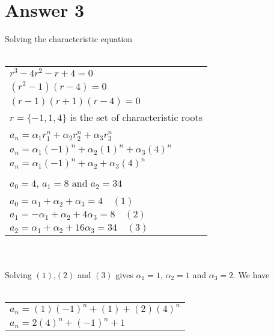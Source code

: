 \documentclass[12pt]{article}
\begin{document}
\section*{Answer 3}
Solving the characteristic equation
\\ \\
\begin{tabular}{l}
    $r^3-4r^2-r+4=0$\\
    $(r^2-1)(r-4)=0$\\
    $(r-1)(r+1)(r-4)=0$\\
    $r=\{ -1,1,4 \}$ is the set of characteristic roots\\
    \\
    $a_n=\alpha_1r_1^n+\alpha_2r_2^n+\alpha_3r_3^n$\\
    $a_n=\alpha_1(-1)^n+\alpha_2(1)^n+\alpha_3(4)^n$\\
    $a_n=\alpha_1(-1)^n+\alpha_2+\alpha_3(4)^n$\\
    \\
    $a_0=4$, $a_1=8$ and $a_2=34$\\
    \\
    $a_0=\alpha_1+\alpha_2+\alpha_3=4 \quad (1)$\\
    $a_1=-\alpha_1+\alpha_2+4\alpha_3=8 \quad (2)$\\
    $a_2=\alpha_1+\alpha_2+16\alpha_3=34 \quad (3)$\\
\end{tabular}
\\ \\
Solving $(1)$,$(2)$ and $(3)$ gives $\alpha_1=1$, $\alpha_2=1$ and $\alpha_3=2$. We have
\\ \\
\begin{tabular}{l}
    $a_n=(1)(-1)^n+(1)+(2)(4)^n$\\
    $a_n=2(4)^n+(-1)^n+1$\\
\end{tabular}
\end{document}
